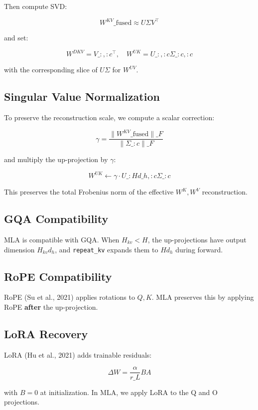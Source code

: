 Then compute SVD:

\[
W^{KV}\_\text{fused} \approx U \Sigma V^\top
\tag{3.7}
\]

and set:

\[
W^{DKV} = V\_{:, :c}^\top, \quad
W^{UK} = U\_{:, :c} \Sigma\_{:c, :c}
\tag{3.8}
\]

with the corresponding slice of $U \Sigma$ for $W^{UV}$.

\subsection{Singular Value Normalization}

To preserve the reconstruction scale, we compute a scalar correction:

\[
\gamma = \frac{\|W^{KV}\_\text{fused}\|\_F}{\|\Sigma\_{:c}\|\_F}
\tag{3.9}
\]

and multiply the up-projection by $\gamma$:

\[
W^{UK} \leftarrow \gamma \cdot U\_{:H d\_h, :c} \Sigma\_{:c}
\tag{3.10}
\]

This preserves the total Frobenius norm of the effective $W^K, W^V$ 
reconstruction.

\subsection{GQA Compatibility}

MLA is compatible with GQA. When $H_{kv} < H$, the up-projections have 
output dimension $H_{kv} d_h$, and \texttt{repeat\_kv} expands them to $H d_h$ 
during forward.

\subsection{RoPE Compatibility}

RoPE (Su et al., 2021) applies rotations to $Q, K$. MLA preserves this by 
applying RoPE \textbf{after} the up-projection.

\subsection{LoRA Recovery}

LoRA (Hu et al., 2021) adds trainable residuals:

\[
\Delta W = \frac{\alpha}{r\_L} B A
\tag{3.11}
\]

with $B = 0$ at initialization. In MLA, we apply LoRA to the Q and O 
projections.

